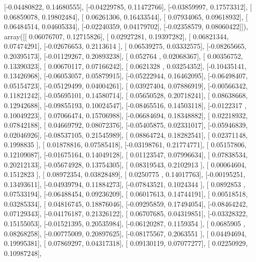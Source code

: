 \documentclass{article}
\begin{document}
       [-0.04480822,  0.14680555],
       [-0.04229785,  0.11472766],
       [-0.03859997,  0.17573312],
       [ 0.06859078,  0.19802484],
       [ 0.06261306,  0.16433544],
       [ 0.07934065,  0.09618932],
       [ 0.06484514,  0.04605334],
       [-0.02240359,  0.04179702],
       [-0.02358579,  0.08060422]]), array([[ 0.06076707,  0.12715826],
       [ 0.02927281,  0.19397282],
       [ 0.06821344,  0.07474291],
       [-0.02676653,  0.2113614 ],
       [ 0.06539275,  0.03332575],
       [-0.08265665,  0.20395173],
       [-0.01129267,  0.20893238],
       [ 0.052764  ,  0.02068367],
       [ 0.00356752,  0.13390323],
       [ 0.00670117,  0.07166242],
       [ 0.0621328 ,  0.03254352],
       [-0.10435141,  0.13426968],
       [-0.06053057,  0.05879915],
       [-0.05222944,  0.16462095],
       [-0.06498407,  0.05154723],
       [-0.05129499,  0.04004261],
       [ 0.03927404,  0.07886919],
       [-0.00566342,  0.11821242],
       [-0.05695101,  0.14580714],
       [ 0.05650528,  0.20718241],
       [ 0.08638668,  0.12942688],
       [-0.09855193,  0.10024547],
       [-0.08465516,  0.14503118],
       [-0.0122317 ,  0.10049223],
       [ 0.07066474,  0.15706988],
       [-0.06684694,  0.18348882],
       [ 0.02218932,  0.07842188],
       [ 0.04669792,  0.08072376],
       [-0.05405875,  0.02331017],
       [-0.05946839,  0.02046926],
       [-0.08537105,  0.21545989],
       [ 0.08864724,  0.18282541],
       [ 0.02371148,  0.1998835 ],
       [ 0.01878816,  0.07585418],
       [-0.03198761,  0.21774771],
       [ 0.05157806,  0.12109087],
       [-0.01675164,  0.14049128],
       [ 0.01123547,  0.07996634],
       [ 0.07838534,  0.20212133],
       [-0.05674928,  0.13754305],
       [ 0.08319543,  0.2102913 ],
       [ 0.00064604,  0.1512823 ],
       [ 0.08972354,  0.03828489],
       [ 0.0250775 ,  0.14017763],
       [-0.00195251,  0.13493611],
       [-0.04939794,  0.11884273],
       [-0.07843521,  0.1024344 ],
       [ 0.0892853 ,  0.07533194],
       [-0.06488454,  0.09236209],
       [ 0.06017613,  0.14744191],
       [ 0.00518518,  0.03285334],
       [ 0.04816745,  0.18876046],
       [-0.09295859,  0.17494054],
       [-0.08464242,  0.07129343],
       [-0.04176187,  0.21326122],
       [ 0.06707685,  0.04319851],
       [-0.03328322,  0.15155053],
       [-0.01521395,  0.20535984],
       [-0.06120287,  0.1159354 ],
       [ 0.0685905 ,  0.08268258],
       [-0.00775009,  0.20897625],
       [-0.08175567,  0.2063551 ],
       [ 0.04494694,  0.19995381],
       [ 0.07869297,  0.04317318],
       [ 0.09130119,  0.07077277],
       [ 0.02250929,  0.10987248],
\end{document}
